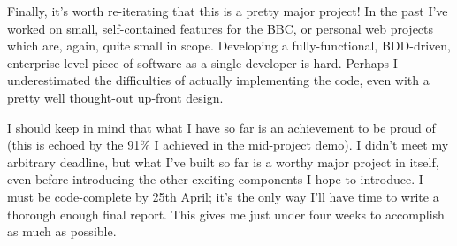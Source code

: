 Finally, it's worth re-iterating that this is a pretty major project! In the past I've worked on small, self-contained features for the BBC, or personal web projects which are, again, quite small in scope. Developing a fully-functional, BDD-driven, enterprise-level piece of software as a single developer is hard. Perhaps I underestimated the difficulties of actually implementing the code, even with a pretty well thought-out up-front design.

I should keep in mind that what I have so far is an achievement to be proud of (this is echoed by the 91\% I achieved in the mid-project demo). I didn't meet my arbitrary deadline, but what I've built so far is a worthy major project in itself, even before introducing the other exciting components I hope to introduce. I must be code-complete by 25th April; it's the only way I'll have time to write a thorough enough final report. This gives me just under four weeks to accomplish as much as possible.